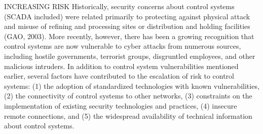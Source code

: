 \documentclass{article}
\begin{document}
INCREASING RISK Historically, security concerns about control systems
(SCADA included) were related primarily to protecting against physical
attack and misuse of refining and processing sites or distribution and
holding facilities (GAO, 2003). More recently, however, there has been a
growing recognition that control systems are now vulnerable to cyber
attacks from numerous sources, including hostile governments, terrorist
groups, disgruntled employees, and other malicious intruders. In
addition to control system vulnerabilities mentioned earlier, several
factors have contributed to the escalation of risk to control systems:
(1) the adoption of standardized technologies with known
vulnerabilities, (2) the connectivity of control systems to other
networks, (3) constraints on the implementation of existing security
technologies and practices, (4) insecure remote connections, and (5) the
widespread availability of technical information about control systems.
\end{document}

